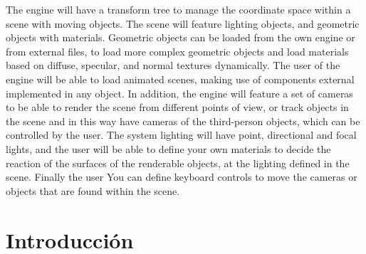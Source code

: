 \documentclass[a4paper]{book}
\begin{document}

The engine will have a transform tree to manage the coordinate space
within a scene with moving objects. The scene will feature lighting objects,
and geometric objects with materials. Geometric objects can be loaded from the
own engine or from external files, to load more complex geometric objects and
load materials based on diffuse, specular, and normal textures dynamically.
The user of the engine will be able to load animated scenes, making use of components
external implemented in any object. In addition, the engine will feature a set of
cameras to be able to render the scene from different points of view,
or track objects in the scene and in this way have cameras of the
third-person objects, which can be controlled by the user. The system
lighting will have point, directional and focal lights, and the user will be able to
define your own materials to decide the reaction of the surfaces of the
renderable objects, at the lighting defined in the scene. Finally the user
You can define keyboard controls to move the cameras or objects that are found
within the scene.




\tableofcontents
\cleardoublepage
\listoffigures %



\cleardoublepage
\chapter{Introducción}
\label{sec:intro} %
\end{document}
